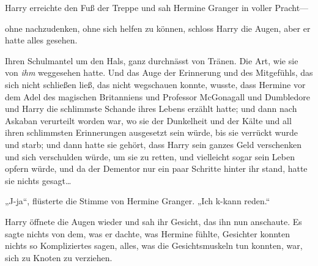 Harry erreichte den Fuß der Treppe und sah Hermine Granger in voller Pracht—

ohne nachzudenken, ohne sich helfen zu können, schloss Harry die Augen, aber er hatte alles gesehen.



Ihren Schulmantel um den Hals, ganz durchnässt von Tränen. Die Art, wie sie von \emph{ihm} weggesehen hatte. Und das Auge der Erinnerung und des Mitgefühls, das sich nicht schließen ließ, das nicht wegschauen konnte, wusste, dass Hermine vor dem Adel des magischen Britanniens und Professor McGonagall und Dumbledore und Harry die schlimmste Schande ihres Lebens erzählt hatte; und dann nach Askaban verurteilt worden war, wo sie der Dunkelheit und der Kälte und all ihren schlimmsten Erinnerungen ausgesetzt sein würde, bis sie verrückt wurde und starb; und dann hatte sie gehört, dass Harry sein ganzes Geld verschenken und sich verschulden würde, um sie zu retten, und vielleicht sogar sein Leben opfern würde, und da der Dementor nur ein paar Schritte hinter ihr stand, hatte sie nichts gesagt…

„J-ja“, flüsterte die Stimme von Hermine Granger.
„Ich k-kann reden.“

Harry öffnete die Augen wieder und sah ihr Gesicht, das ihn nun anschaute. Es sagte nichts von dem, was er dachte, was Hermine fühlte, Gesichter konnten nichts so Kompliziertes sagen, alles, was die Gesichtsmuskeln tun konnten, war, sich zu Knoten zu verziehen.

